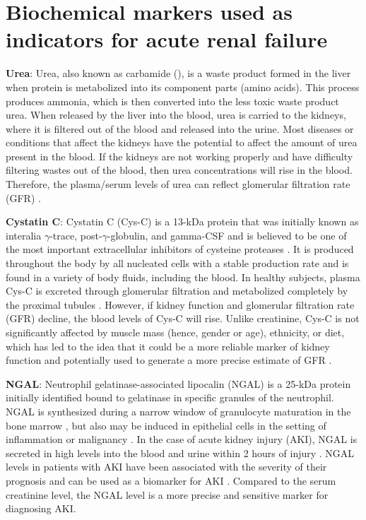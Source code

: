 \documentclass[11pt]{article}
\begin{document}
\section{Biochemical markers used as indicators for acute renal failure}
\begin{enumerate*}[{[a)]}]
    \item {
        \begin{enumerate*}[{[1)]}]
            \item \textbf{Urea}: Urea, also known as carbamide (), is a waste product formed in the liver when protein is metabolized into its component parts (amino acids). This process produces ammonia, which is then converted into the less toxic waste product urea. When released by the liver into the blood, urea is carried to the kidneys, where it is filtered out of the blood and released into the urine. Most diseases or conditions that affect the kidneys have the potential to affect the amount of urea present in the blood. If the kidneys are not working properly and have difficulty filtering wastes out of the blood, then urea concentrations will rise in the blood. Therefore, the plasma/serum levels of urea can reflect glomerular filtration rate (GFR) \citep{levey1999more}.
            \item \textbf{Cystatin C}: Cystatin C (Cys-C) is a 13-kDa protein that was initially known as interalia $\gamma$-trace, post-$\gamma$-globulin, and gamma-CSF and is believed to be one of the most important extracellular inhibitors of cysteine proteases \citep{vaidya2008biomarkers}. It is produced throughout the body by all nucleated cells with a stable production rate and is found in a variety of body fluids, including the blood. In healthy subjects, plasma Cys-C is excreted through glomerular filtration and metabolized completely by the proximal tubules \citep{de2012biomarkers}. However, if kidney function and glomerular filtration rate (GFR) decline, the blood levels of Cys-C will rise. Unlike creatinine, Cys-C is not significantly affected by muscle mass (hence, gender or age), ethnicity, or diet, which has led to the idea that it could be a more reliable marker of kidney function and potentially used to generate a more precise estimate of GFR \citep{dharnidharka2002serum, roos2007diagnostic}. 
            \item \textbf{NGAL}: Neutrophil gelatinase-associated lipocalin (NGAL) is a 25-kDa protein initially identified bound to gelatinase in specific granules of the neutrophil. NGAL is synthesized during a narrow window of granulocyte maturation in the bone marrow \citep{borregaard1995biosynthesis}, but also may be induced in epithelial cells in the setting of inflammation or malignancy \citep{nielsen1996induction}. In the case of acute kidney injury (AKI), NGAL is secreted in high levels into the blood and urine within 2 hours of injury \citep{bennett2008urine}. NGAL levels in patients with AKI have been associated with the severity of their prognosis and can be used as a biomarker for AKI \citep{han2009urinary}. Compared to the serum creatinine level, the NGAL level is a more precise and sensitive marker for diagnosing AKI. 

\end{enumerate*}}
\end{enumerate*}
\end{document}
